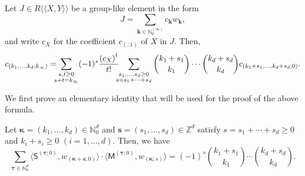 \documentclass[ALCO,Unicode,published]{cedram}
\def\bk{{\mathbf{k}}}
\def\MM{{\mathsf{M}}}
\def\SS{{\mathsf{S}}}
\def\bs{{\mathbf{s}}}
\def\bkappa{{\boldsymbol \kappa}}
\def\btau{{\boldsymbol \tau}}
\def\lp{\langle}
\def\rp{\rangle}
\def\N{{\mathbb N}}
\def\Z{{\mathbb Z}}
\def\la{\langle}
\def\ra{\rangle}
\def\lala{\la\!\la}
\def\rara{\ra\!\ra}
\def\bkappa{{\boldsymbol \kappa}}
\begin{document}
\begin{Theorem}
\label{LeMuFu}
Let $J\in R\lala X,Y\rara$ be a group-like element in the form
$$
J=\sum_{\bk\in\N_0^{(\infty)}} c_\bk w_\bk,
$$
and write $c_X$ for the coefficient $c_{(;1)}$ of $X$ in $J$. 
Then,
$$
c_{(k_1,\dots,k_d;k_\infty)}= \hspace{-0.2cm} \sum_{\substack{s,t\ge 0 \\ s+t=k_\infty}}
(-1)^s
\frac{{(c_X)}^t}{t!}
\hspace{-0.2cm} \sum_{\substack{ s_1,\dots,s_d\ge 0 \\ s=s_1+\dots+s_d}}
\binom{k_1+s_1}{k_1}\cdots \binom{k_d+s_d}{k_d}
c_{(k_1+s_1,\dots,k_d+s_d;0)}.
$$
\end{Theorem}


We first prove an elementary identity that will be used for the proof of the above formula.

\begin{Lemma} \label{lem2}
Let $\bkappa=(k_1,\dots,k_d)\in\N_0^d$ and $\bs=(s_1,\dots,s_d)\in \Z^d$
satisfy $s=s_1+\cdots+s_d\ge 0$ and $k_i+s_i\ge 0$ $(i=1,\dots,d)$.
Then,  we have
$$
\sum_{\btau\in\N_0^d} 
\lp\SS^{(\btau;0)},w_{(\bkappa+\bs;0)}\rp
\cdot \lp\MM^{(\btau;0)}, w_{(\bkappa;s)}\rp
=(-1)^s
\binom{k_1+s_1}{k_1}\cdots \binom{k_d+s_d}{k_d}.
$$
\end{Lemma}
\end{document}
